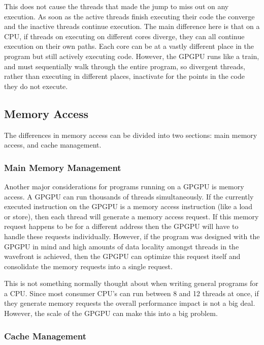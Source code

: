 This does not cause the threads that made the jump to miss out on any execution. As soon as the active threads finish executing their code the converge and the inactive threads continue execution. The main difference here is that on a CPU, if threads on executing on different cores diverge, they can all continue execution on their own paths. Each core can be at a vastly different place in the program but still actively executing code. However, the GPGPU runs like a train, and must sequentially walk through the entire program, so divergent threads, rather than executing in different places, inactivate for the points in the code they do not execute. \cite{memcached}

\subsection*{Memory Access}

The differences in memory access can be divided into two sections: main memory access, and cache management. 

\subsubsection*{Main Memory Management}

Another major considerations for programs running on a GPGPU is memory access. A GPGPU can run thousands of threads simultaneously. If the currently executed instruction on the GPGPU is a memory access instruction (like a load or store), then each thread will generate a memory access request. If this memory request happens to be for a different address then the GPGPU will have to handle these requests individually. However, if the program was designed with the GPGPU in mind and high amounts of data locality amongst threads in the wavefront is achieved, then the GPGPU can optimize this request itself and consolidate the memory requests into a single request.

This is not something normally thought about when writing general programs for a CPU. Since most consumer CPU's can run between 8 and 12 threads at once, if they generate memory requests the overall performance impact is not a big deal. However, the scale of the GPGPU can make this into a big problem. \cite{memcached}

\subsubsection*{Cache Management}

